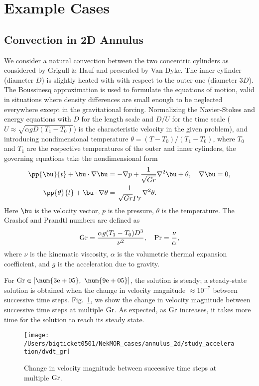 \section{Example Cases}
\subsection{Convection in 2D Annulus}
We consider a natural convection between the two concentric cylinders as
considered by Grigull \& Hauf and presented by Van Dyke. The inner cylinder
(diameter $D$) is slightly heated with with respect to the outer one (diameter
$3D$). The Boussinesq approximation is used to formulate the equations of
motion, valid in situations where density differences are small enough to be
neglected everywhere except in the gravitational forcing.  
Normalizing the Navier-Stokes and energy equations with $D$ for the length
scale and $D/U$ for the time scale ($U \approx \sqrt{\alpha g D (T_1-T_0)}$) is
the characteristic velocity in the given problem), and introducing
nondimensional temperature $\theta=(T-T_0)/(T_1-T_0)$, where $T_0$ and $T_1$
are the respective temperatures of the outer and inner cylinders, the governing
equations take the nondimensional form
\begin{align}
   \pp{\bu}{t} + \bu \cdot \nabla \bu & = -\nabla p + \frac{1}{\sqrt{Gr}}
\nabla^2 \bu + \theta, \quad \nabla \bu = 0, \\ \pp{\theta}{t} + \bu \cdot
\nabla \theta & = \frac{1}{\sqrt{Gr}Pr} \nabla^2 \theta.
\end{align}
Here $\bu$ is the velocity vector, $p$ is the pressure, $\theta$ is the
temperature.  The Grashof and Prandtl numbers are defined as
\begin{equation}
   {\rm Gr} = \frac{\alpha g (T_1-T_0) D^3}{\nu^2}, \quad {\rm Pr} =
\frac{\nu}{\alpha},
\end{equation}
where $\nu$ is the kinematic viscosity, $\alpha$ is the volumetric thermal
expansion coefficient, and $g$ is the acceleration due to gravity. 

For $\rm Gr \in [\num{3e+05},~\num{9e+05}]$, the solution is steady; a
steady-state solution is obtained when the change in velocity magnitude
$\approx 10^{-7}$ between successive time steps.  Fig.~\ref{fig:1}, we show the
change in velocity magnitude between successive time steps at multiple $\rm
Gr$. As expected, as $\rm Gr$ increases, it takes more time for the solution to
reach its steady state.
\begin{figure}[!h]
     \centering
     \texttt{[image: /Users/bigticket0501/NekMOR\_cases/annulus\_2d/study\_acceleration/dvdt\_gr]}
     \caption{Change in velocity magnitude between successive time steps at
     multiple $\rm Gr$.} \label{fig:1}
\end{figure}

